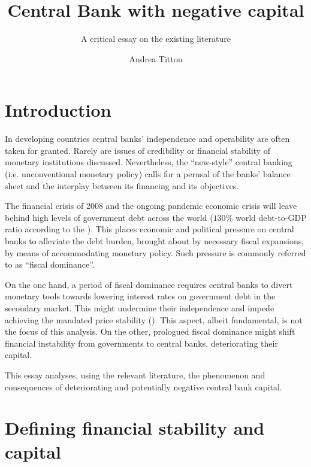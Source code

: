 \documentclass[american]{scrartcl}
\title{Central Bank with negative capital} %
\subtitle{A critical essay on the existing literature}
\author{Andrea Titton}
\begin{document}
\clearpage
\thispagestyle{empty}
\maketitle
\clearpage


\iffalse
    History | Theory of CB dividends | Financial stability under deferred assets |
    Expectations of Inflation | Effects on global banks
\fi


\section{Introduction}

In developing countries central banks' independence and operability are often taken for granted. Rarely are issues of credibility or financial stability of monetary institutions discussed. Nevertheless, the ``new-style'' central banking (i.e. unconventional monetary policy) calls for a perusal of the banks' balance sheet and the interplay between its financing and its objectives.

The financial crisis of 2008 and the ongoing pandemic economic crisis will leave behind high levels of government debt across the world ($130\%$ world debt-to-GDP ratio according to the \cite{WEO2020}). This places economic and political pressure on central banks to alleviate the debt burden, brought about by necessary fiscal expansions, by means of accommodating monetary policy. Such pressure is commonly referred to as ``fiscal dominance''.

On the one hand, a period of fiscal dominance requires central banks to divert monetary tools towards lowering interest rates on government debt in the secondary market. This might undermine their independence and impede achieving the mandated price stability (\cite{Schnabel2020}). This aspect, albeit fundamental, is not the focus of this analysis. On the other, prologued fiscal dominance might shift financial instability from governments to central banks, deteriorating their capital. %

This essay analyses, using the relevant literature, the phenomenon and consequences of deteriorating and potentially negative central bank capital. %

\section{Defining financial stability and capital}
\end{document}
